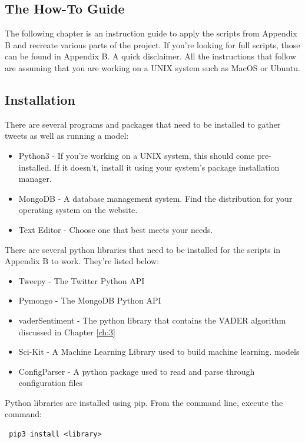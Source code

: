 \documentclass[11pt, twoside, reqno]{book}
\begin{document}
\begin{appendices}
\chapter{The How-To Guide}
\hspace{0.2in}The following chapter is an instruction guide to apply the scripts from Appendix B and recreate various parts of the project. If you're looking for full scripts, those can be found in Appendix B. A quick disclaimer. All the instructions that follow are assuming that you are working on a UNIX system such as MacOS or Ubuntu.  

\section{Installation}
\label{sec:install}
There are several programs and packages that need to be installed to gather tweets as well as running a model:
\begin{itemize}
	\item Python3 - If you're working on a UNIX system, this should come pre-installed. If it doesn't, install it using your system's package installation manager. 
	\item MongoDB - A database management system. Find the distribution for your operating system on the website. 
	\item Text Editor - Choose one that best meets your needs. 
\end{itemize}
\newpage
There are several python libraries that need to be installed for the scripts in Appendix B to work. They're listed below:
\begin{itemize}
	\item Tweepy - The Twitter Python API
	\item Pymongo - The MongoDB Python API
	\item vaderSentiment - The python library that contains the VADER algorithm discussed in Chapter \ref{ch:3} 
	\item Sci-Kit - A Machine Learning Library used to build machine learning. models
	\item ConfigParser - A python package used to read and parse through configuration files
\end{itemize}
Python libraries are installed using pip. From the command line, execute the command: \begin{verbatim} pip3 install <library> \end{verbatim}


\end{appendices}
\end{document}

